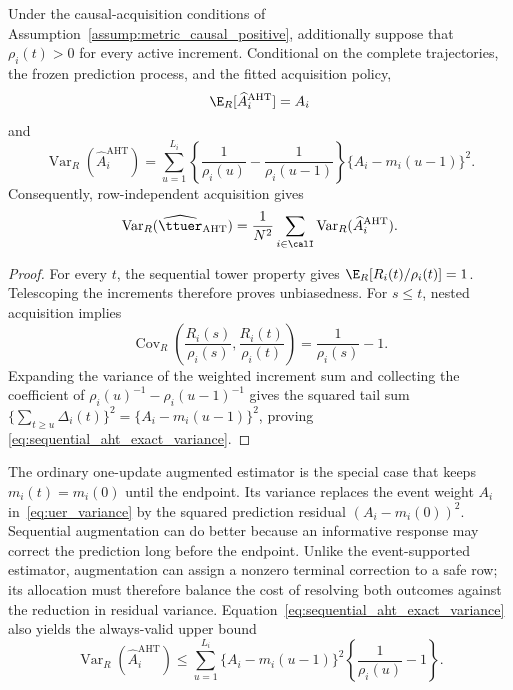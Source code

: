 \begin{theorem}
\label{thm:sequential_aht_variance}
Under the causal-acquisition conditions of
Assumption~\ref{assump:metric_causal_positive}, additionally suppose that
$\rho_i(t)>0$ for every active increment.  Conditional on the complete
trajectories, the frozen prediction process, and the fitted acquisition
policy,
\begin{equation}
    \E_R[\widehat A_i^{\mathrm{AHT}}]=A_i
\end{equation}
and
\begin{equation}
    \operatorname{Var}_R(\widehat A_i^{\mathrm{AHT}})
    =\sum_{u=1}^{L_i}
      \left\{\frac{1}{\rho_i(u)}-
      \frac{1}{\rho_i(u-1)}\right\}
      \{A_i-m_i(u-1)\}^2.
    \label{eq:sequential_aht_exact_variance}
\end{equation}
Consequently, row-independent acquisition gives
\begin{equation}
    \operatorname{Var}_R(\widehat{\ttuer}_{\mathrm{AHT}})
    =\frac{1}{N^2}\sum_{i\in\calI}
      \operatorname{Var}_R(\widehat A_i^{\mathrm{AHT}}).
\end{equation}
\end{theorem}

\begin{proof}
For every $t$, the sequential tower property gives
$\E_R[R_i(t)/\rho_i(t)]=1$.  Telescoping the increments therefore proves
unbiasedness.  For $s\leq t$, nested acquisition implies
\begin{equation}
    \operatorname{Cov}_R\!\left(
      \frac{R_i(s)}{\rho_i(s)},
      \frac{R_i(t)}{\rho_i(t)}
    \right)=\frac{1}{\rho_i(s)}-1.
\end{equation}
Expanding the variance of the weighted increment sum and collecting the
coefficient of
$\rho_i(u)^{-1}-\rho_i(u-1)^{-1}$ gives the squared tail sum
$\{\sum_{t\geq u}\Delta_i(t)\}^2
=\{A_i-m_i(u-1)\}^2$, proving
\eqref{eq:sequential_aht_exact_variance}.
\end{proof}

The ordinary one-update augmented estimator is the special case that keeps
$m_i(t)=m_i(0)$ until the endpoint.  Its variance replaces the event weight
$A_i$ in~\eqref{eq:uer_variance} by the squared prediction residual
$(A_i-m_i(0))^2$.  Sequential augmentation can do better because an
informative response may correct the prediction long before the endpoint.
Unlike the event-supported estimator, augmentation can assign a nonzero
terminal correction to a safe row; its allocation must therefore balance the
cost of resolving both outcomes against the reduction in residual variance.
Equation~\eqref{eq:sequential_aht_exact_variance} also yields the always-valid
upper bound
\begin{equation}
    \operatorname{Var}_R(\widehat A_i^{\mathrm{AHT}})
    \leq\sum_{u=1}^{L_i}
      \{A_i-m_i(u-1)\}^2
      \left\{\frac{1}{\rho_i(u)}-1\right\}.
    \label{eq:sequential_aht_residual_bound}
\end{equation}

